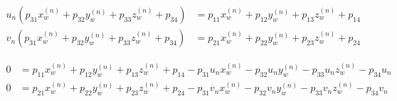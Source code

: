 \begin{align}
    u_n(p_{31}x_w^{(n)} + p_{32}y_w^{(n)} + p_{33}z_w^{(n)} + p_{34}) & = p_{11}x_w^{(n)} + p_{12}y_w^{(n)} + p_{13}z_w^{(n)} + p_{14} \\
    v_n(p_{31}x_w^{(n)} + p_{32}y_w^{(n)} + p_{33}z_w^{(n)} + p_{34}) & = p_{21}x_w^{(n)} + p_{22}y_w^{(n)} + p_{23}z_w^{(n)} + p_{24}
\end{align}

\begin{align}
    0 & = p_{11}x_w^{(n)} + p_{12}y_w^{(n)} + p_{13}z_w^{(n)} + p_{14} - p_{31}u_nx_w^{(n)} - p_{32}u_ny_w^{(n)} - p_{33}u_nz_w^{(n)} - p_{34}u_n \\
    0 & = p_{21}x_w^{(n)} + p_{22}y_w^{(n)} + p_{23}z_w^{(n)} + p_{24} - p_{31}v_nx_w^{(n)} - p_{32}v_ny_w^{(n)} - p_{33}v_nz_w^{(n)} - p_{34}v_n
\end{align}

